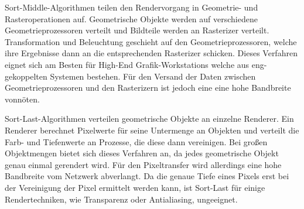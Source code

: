 Sort-Middle-Algorithmen teilen den Rendervorgang in Geometrie- und Rasteroperationen auf. Geometrische Objekte werden auf verschiedene Geometrieprozessoren verteilt und Bildteile werden an Rasterizer verteilt. Transformation und Beleuchtung geschieht auf den Geometrieprozessoren, welche ihre Ergebnisse dann an die entsprechenden Rasterizer schicken. Dieses Verfahren eignet sich am Besten für High-End Grafik-Workstations welche aus eng-gekoppelten Systemen bestehen. Für den Versand der Daten zwischen Geometrieprozessoren und den Rasterizern ist jedoch eine eine hohe Bandbreite vonnöten.

Sort-Last-Algorithmen verteilen geometrische Objekte an einzelne Renderer. Ein Renderer berechnet Pixelwerte für seine Untermenge an Objekten und verteilt die Farb- und Tiefenwerte an Prozesse, die diese dann vereinigen. Bei großen Objektmengen bietet sich dieses Verfahren an, da jedes geometrische Objekt genau einmal gerendert wird. Für den Pixeltransfer wird allerdings eine hohe Bandbreite vom Netzwerk abverlangt. Da die genaue Tiefe eines Pixels erst bei der Vereinigung der Pixel ermittelt werden kann, ist Sort-Last für einige Rendertechniken, wie Transparenz oder Antialiasing, ungeeignet.

